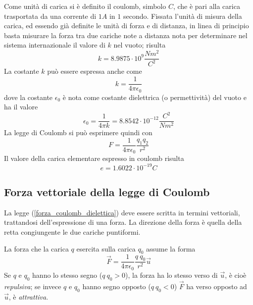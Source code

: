 \documentclass[class=book, crop=false, oneside, 12pt]{standalone}
\begin{document}
Come unità di carica si è definito il coulomb, simbolo \(C\), che è pari alla carica trasportata da una corrente di \(1 A\) in \(1\) secondo. \newline
Fissata l'unità di misura della carica, ed essendo già definite le unità di forza e di distanza, in linea di principio basta misurare la forza tra due cariche note a distanza nota per determinare nel sistema internazionale il valore di \(k\) nel vuoto; risulta
\begin{equation}
    k = 8.9875 \cdot 10^9 \frac{Nm^2}{C^2}
\end{equation}
La costante \(k\) può essere espressa anche come 
\begin{equation*}
    k = \frac{1}{4 \pi \epsilon_0}
\end{equation*}
dove la costante \(\epsilon_0\) è nota come costante dielettrica (o permettività) del vuoto e ha il valore
\begin{equation}
    \epsilon_0 = \frac{1}{4 \pi k} = 8.8542 \cdot 10^{-12} \frac{C^2}{N m^2}
\end{equation}
La legge di Coulomb si può esprimere quindi con
\begin{equation} \label{forza_coulomb_dielettica}
    F = \frac{1}{4 \pi \epsilon_0} \frac{q_1 q_2}{r^2}
\end{equation}
Il valore della carica elementare espresso in coulomb risulta 
\begin{equation}
    e = 1.6022 \cdot 10^{-19} C
\end{equation}

\subsection{Forza vettoriale della legge di Coulomb}

La legge (\ref{forza_coulomb_dielettica}) deve essere scritta in termini vettoriali, trattandosi dell'espressione di una forza.
La direzione della forza è quella della retta congiungente le due cariche puntiformi.

La forza che la carica \(q\) esercita sulla carica \(q_0\) assume la forma
\begin{equation}
    \overrightarrow{F} = \frac{1}{4 \pi \epsilon_0} \frac{q \ q_0}{r^2} \overrightarrow{u}
\end{equation}
Se \(q\) e \(q_0\) hanno lo stesso segno (\(q \ q_0 > 0\)), la forza ha lo stesso verso di \(\overrightarrow{u}\), è cioè \emph{repulsiva}; se invece \(q\) e \(q_0\) hanno segno opposto (\(q \ q_0 < 0\)) \(\overrightarrow{F}\) ha verso opposto ad \(\overrightarrow{u}\), è \emph{attrattiva}.
\end{document}
